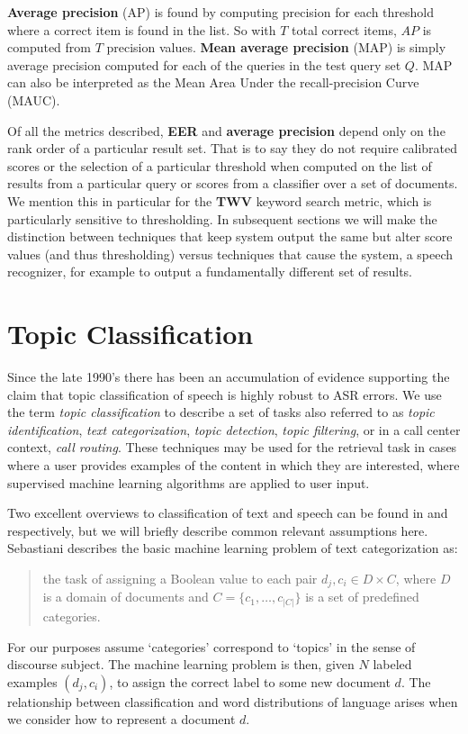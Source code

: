 \textbf{Average precision} (AP) is found by computing precision for each threshold where a correct item is found in the list.  So with $T$ total correct items, $AP$ is computed from $T$ precision values.   \textbf{Mean average precision} (MAP) is simply average precision computed for each of the queries in the test query set $Q$.  MAP can also be interpreted as the Mean Area Under the recall-precision Curve (MAUC). 

Of all the metrics described, \textbf{EER} and \textbf{average precision} depend only on the rank order of a particular result set.  That is to say they do not require calibrated scores or the selection of a particular threshold when computed on the list of results from a particular query or scores from a classifier over a set of documents.  We mention this in particular for the \textbf{TWV} keyword search metric, which is particularly sensitive to thresholding.  In subsequent sections we will make the distinction between techniques that keep system output the same but alter score values (and thus thresholding) versus techniques that cause the system, a speech recognizer, for example to output a fundamentally different set of results.

\section{Topic Classification}
\label{sec:bkgClassification}

Since the late 1990's there has been an accumulation of evidence supporting the claim that topic classification of speech is highly robust to ASR errors.  We use the term \textit{topic classification} to describe a set of tasks also referred to as \textit{topic identification}, \textit{text categorization}, \textit{topic detection}, \textit{topic filtering}, or in a call center context, \textit{call routing}.  These techniques may be used for the retrieval task in cases where a user provides examples of the content in which they are interested, where supervised machine learning algorithms are applied to user input. %

Two excellent overviews to classification of text and speech can be found in \cite{sebastiani2002} and \cite{hazen2011} respectively, but we will briefly describe common relevant assumptions here.  Sebastiani describes the basic machine learning problem of text categorization as:  \\
\begin{quote}
the task of assigning a Boolean value to each pair $d_j,c_i \in D\times C$, where $D$ is a domain of documents and $C = \{c_1,\ldots, c_{|C|}\}$ is a set of predefined
categories.\cite{sebastiani2002}
\end{quote}
\noindent For our purposes assume `categories' correspond to `topics' in the sense of discourse subject.  The machine learning problem is then, given $N$ labeled examples $(d_j,c_i)$, to assign the correct label to some new document $d$.  The relationship between classification and word distributions of language arises when we consider how to represent a document $d$.  

